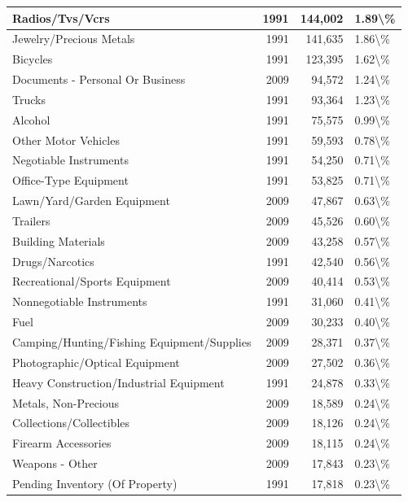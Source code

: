 \documentclass[
]{krantz}
\begin{document}
\begin{longtable}[t]{l|r|r|l}
\hline
Radios/Tvs/Vcrs & 1991 & 144,002 & 1.89\textbackslash{}\%\\
\hline
Jewelry/Precious Metals & 1991 & 141,635 & 1.86\textbackslash{}\%\\
\hline
Bicycles & 1991 & 123,395 & 1.62\textbackslash{}\%\\
\hline
Documents - Personal Or Business & 2009 & 94,572 & 1.24\textbackslash{}\%\\
\hline
Trucks & 1991 & 93,364 & 1.23\textbackslash{}\%\\
\hline
Alcohol & 1991 & 75,575 & 0.99\textbackslash{}\%\\
\hline
Other Motor Vehicles & 1991 & 59,593 & 0.78\textbackslash{}\%\\
\hline
Negotiable Instruments & 1991 & 54,250 & 0.71\textbackslash{}\%\\
\hline
Office-Type Equipment & 1991 & 53,825 & 0.71\textbackslash{}\%\\
\hline
Lawn/Yard/Garden Equipment & 2009 & 47,867 & 0.63\textbackslash{}\%\\
\hline
Trailers & 2009 & 45,526 & 0.60\textbackslash{}\%\\
\hline
Building Materials & 2009 & 43,258 & 0.57\textbackslash{}\%\\
\hline
Drugs/Narcotics & 1991 & 42,540 & 0.56\textbackslash{}\%\\
\hline
Recreational/Sports Equipment & 2009 & 40,414 & 0.53\textbackslash{}\%\\
\hline
Nonnegotiable Instruments & 1991 & 31,060 & 0.41\textbackslash{}\%\\
\hline
Fuel & 2009 & 30,233 & 0.40\textbackslash{}\%\\
\hline
Camping/Hunting/Fishing Equipment/Supplies & 2009 & 28,371 & 0.37\textbackslash{}\%\\
\hline
Photographic/Optical Equipment & 2009 & 27,502 & 0.36\textbackslash{}\%\\
\hline
Heavy Construction/Industrial Equipment & 1991 & 24,878 & 0.33\textbackslash{}\%\\
\hline
Metals, Non-Precious & 2009 & 18,589 & 0.24\textbackslash{}\%\\
\hline
Collections/Collectibles & 2009 & 18,126 & 0.24\textbackslash{}\%\\
\hline
Firearm Accessories & 2009 & 18,115 & 0.24\textbackslash{}\%\\
\hline
Weapons - Other & 2009 & 17,843 & 0.23\textbackslash{}\%\\
\hline
Pending Inventory (Of Property) & 1991 & 17,818 & 0.23\textbackslash{}\%\\

\end{longtable}
\end{document}
